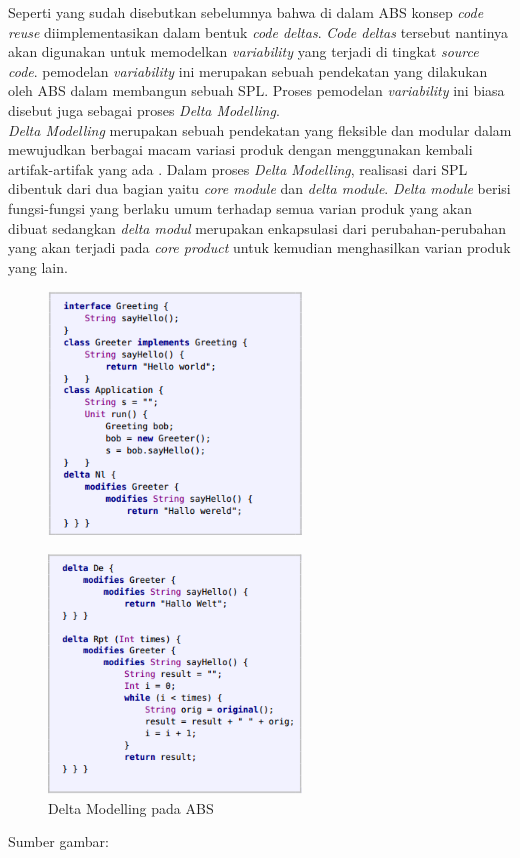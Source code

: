 \noindent
Seperti yang sudah disebutkan sebelumnya bahwa di dalam ABS konsep \textit{code reuse} diimplementasikan dalam bentuk \textit{code deltas}. \textit{Code deltas} tersebut nantinya akan digunakan untuk memodelkan \textit{variability} yang terjadi di tingkat \textit{source code}. pemodelan \textit{variability} ini merupakan sebuah pendekatan yang dilakukan oleh ABS dalam membangun sebuah SPL. Proses pemodelan \textit{variability} ini biasa disebut juga sebagai proses \textit{Delta Modelling}. \\

\noindent
\textit{Delta Modelling} merupakan sebuah pendekatan yang fleksible dan modular dalam mewujudkan berbagai macam variasi produk dengan menggunakan kembali artifak-artifak yang ada \citep{hahnle2013hats}. Dalam proses \textit{Delta Modelling}, realisasi dari SPL dibentuk dari dua bagian yaitu \textit{core module} dan \textit{delta module}. \textit{Delta module} berisi fungsi-fungsi yang berlaku umum terhadap semua varian produk yang akan dibuat sedangkan \textit{delta modul} merupakan enkapsulasi dari perubahan-perubahan yang akan terjadi pada \textit{core product} untuk kemudian menghasilkan varian produk yang lain. \\

\begin{figure}
    \centering
    \includegraphics[width=0.6\textwidth]
        {img/delta-modelling-1.png}
\end{figure}

\begin{figure}
    \centering
    \includegraphics[width=0.6\textwidth]
        {img/delta-modelling-2.png}
    \caption{Delta Modelling pada ABS}
\end{figure}\vspace{-0.8cm}
\begin{center}
{\small Sumber gambar: \citep{clarke2012variability}}
\end{center}